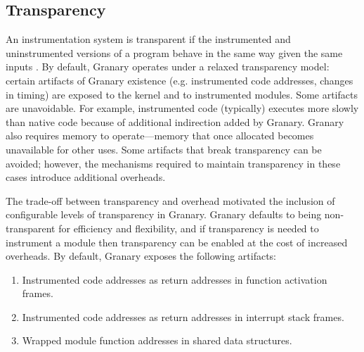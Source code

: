 \documentclass{sigplanconf}
\begin{document}
\subsection{Transparency}\label{sec:transparency}

An instrumentation system is transparent if the instrumented and uninstrumented versions of a program behave in the same way given the same inputs \cite{Transparency}. By default, Granary operates under a relaxed transparency model: certain artifacts of Granary existence (e.g. instrumented code addresses, changes in timing) are exposed to the kernel and to instrumented modules. Some artifacts are unavoidable. For example, instrumented code (typically) executes more slowly than native code because of additional indirection added by Granary. Granary also requires memory to operate---memory that once allocated becomes unavailable for other uses. Some artifacts that break transparency can be avoided; however, the mechanisms required to maintain transparency in these cases introduce additional overheads.

The trade-off between transparency and overhead motivated the inclusion of configurable levels of transparency in Granary. Granary defaults to being non-transparent for efficiency and flexibility, and if transparency is needed to instrument a module then transparency can be enabled at the cost of increased overheads. By default, Granary exposes the following artifacts: \begin{enumerate}
	\item Instrumented code addresses as return addresses in function activation frames.
	\item Instrumented code addresses as return addresses in interrupt stack frames.
	\item Wrapped module function addresses in shared data structures.
\end{enumerate}

\end{document}
